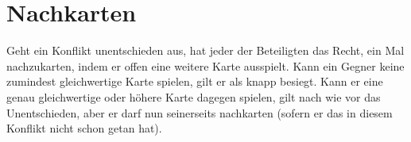 \section{Nachkarten}
Geht ein Konflikt unentschieden aus, hat jeder der Beteiligten das Recht, ein Mal nachzukarten, indem er offen eine weitere Karte ausspielt. Kann ein Gegner keine zumindest gleichwertige Karte spielen, gilt er als knapp besiegt. Kann er eine genau gleichwertige oder höhere Karte dagegen spielen, gilt nach wie vor das Unentschieden, aber er darf nun seinerseits nachkarten (sofern er das in diesem Konflikt nicht schon getan hat).
